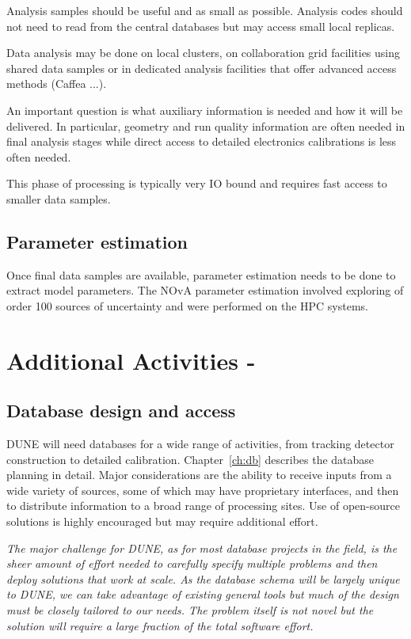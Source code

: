 \documentclass[../main-v1.tex]{subfiles}
\begin{document}
Analysis samples should be useful and as small as possible.  Analysis codes should not need to read from the central databases but may access small local replicas. 

Data analysis may be done on local clusters, on collaboration grid facilities using shared data samples or in dedicated analysis facilities that offer advanced access methods (Caffea ...). 

An important question is what auxiliary information is needed and how it will be delivered. In particular, geometry and run quality information are often needed in final analysis stages while direct access to detailed electronics calibrations is less often needed. 

This phase of processing is typically very IO bound and requires fast access to smaller data samples. 

\subsection{Parameter estimation}
Once final data samples are available, parameter estimation needs to be done to extract model parameters.  The NOvA parameter estimation \cite{NOvA:2021nfi} involved exploring of order 100 sources of uncertainty and were performed on the  HPC systems. 

\section{Additional Activities - }

\subsection{Database design and access}
DUNE will need databases for a wide range of activities, from tracking detector construction to detailed calibration.  Chapter~\ref{ch:db} describes the database planning in detail.  Major considerations are the ability to  receive inputs from a wide variety of sources, some of which may have proprietary interfaces, and then to distribute information to a broad range of processing sites.   Use of open-source solutions is highly encouraged but may require additional effort.

{\it The major challenge for DUNE, as for most database projects in the field, is the sheer amount of effort needed to carefully specify multiple problems and then deploy solutions that work at scale. As the database schema will be largely unique to DUNE, we can take advantage of existing general tools but much of the design must be closely tailored to our needs. The problem itself is not novel but the solution will require a large fraction of the total software effort.}
\end{document}
